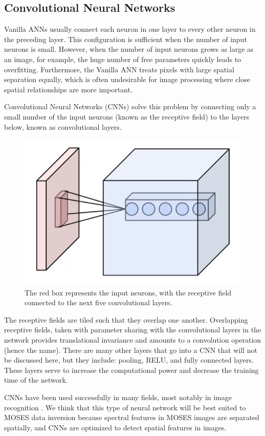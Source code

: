 \documentclass[twoside]{article}
\begin{document}
\begin{multicols}{2}
\subsection{Convolutional Neural Networks}
Vanilla ANNs usually connect each neuron in one layer to every other neuron in the preceding layer. This configuration is sufficient when the number of input neurons is small. However, when the number of input neurons grows as large as an image, for example, the huge number of free parameters quickly leads to overfitting. Furthermore, the Vanilla ANN treats pixels with large spatial separation equally, which is often undesirable for image processing where close spatial relationships are more important. \par Convolutional Neural Networks (CNNs) solve this problem by connecting only a small number of the input neurons (known as the receptive field) to the layers below, known as convolutional layers.
\begin{figure}[H]
	\centering
	\includegraphics[width=0.5\linewidth]{images/Conv_layer}
	\caption{The red box represents the input neurons, with the receptive field connected to the next five convolutional layers.}
\end{figure}
The receptive fields are tiled such that they overlap one another. Overlapping receptive fields, taken with parameter sharing with the convolutional layers in the network provides translational invariance and amounts to a convolution operation (hence the name). There are many other layers that go into a CNN that will not be discussed here, but they include: pooling, RELU, and fully connected layers. These layers serve to increase the computational power and decrease the training time of the network. \par CNNs have been used successfully in many fields, most notably in image recognition \cite{imagenet}. We think that this type of neural network will be best suited to MOSES data inversion because spectral features in MOSES images are separated spatially, and CNNs are optimized to detect spatial features in images.


\end{multicols}
\end{document}
